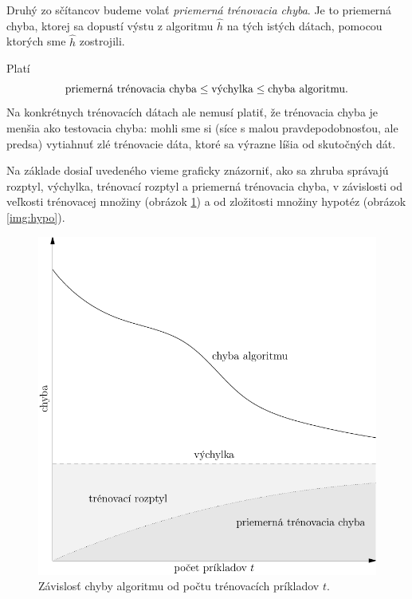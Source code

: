 \medskip

Druhý zo sčítancov budeme volať \emph{priemerná trénovacia chyba}.
Je to priemerná chyba, ktorej sa dopustí výstu z algoritmu $\hat{h}$
na tých istých dátach, pomocou ktorých sme $\hat{h}$ zostrojili.

\medskip

Platí
$$ {\normalfont \text{priemerná trénovacia chyba}} \leq \vychylka \leq \chalg. $$
Na konkrétnych trénovacích dátach ale nemusí platiť, že trénovacia
chyba je menšia ako testovacia chyba: mohli sme si (síce s malou
pravdepodobnosťou, ale predsa) vytiahnuť zlé trénovacie dáta, ktoré
sa výrazne líšia od skutočných dát.

\medskip

Na základe dosiaľ uvedeného vieme graficky znázorniť, ako sa zhruba správajú
rozptyl, výchylka, trénovací rozptyl a priemerná trénovacia chyba,
v závislosti od veľkosti trénovacej množiny (obrázok \ref{img:train})
a od zložitosti množiny hypotéz (obrázok \ref{img:hypo}).

\begin{figure}
  \centering
  \includegraphics[scale=0.8]{obrazky/krivky1.pdf}
  \caption{Závislosť chyby algoritmu od počtu trénovacích príkladov $t$.}
  \label{img:train}
\end{figure}

